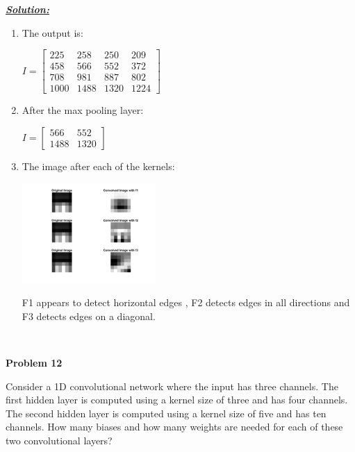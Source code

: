 \documentclass{article}
\begin{document}
\noindent \underline{\textbf{\textit{Solution:}}} \\ 

\begin{enumerate} [label=\Alph*]
    \item The output is:
        \begin{center}
        $ I = \begin{bmatrix}
            225 & 258 & 250 & 209 \\
            458 & 566 & 552 & 372 \\
            708 & 981 & 887 & 802 \\
            1000 & 1488 & 1320 & 1224 
        \end{bmatrix}$ 
        \end{center}

    \item After the max pooling layer: 
        \begin{center}
        $ I = \begin{bmatrix}
            566 & 552 \\
            1488 & 1320
        \end{bmatrix}$ 
        \end{center}

    \item The image after each of the kernels: \\
        \begin{center}
            \includegraphics[width=0.4\textwidth]{problem11images.png}
        \end{center}
        F1 appears to detect horizontal edges , F2 detects edges in all directions and F3 detects edges on a diagonal.
        
            
\end{enumerate}\



\newpage
\noindent \textbf{Problem 12}

\noindent Consider a 1D convolutional network where the input has three channels. The first 
hidden layer is computed using a kernel size of three and has four channels. The second
hidden layer is computed using a kernel size of five and has ten channels. How many 
biases and how many weights are needed for each of these two convolutional layers? \\ \\ \\
\end{document}
